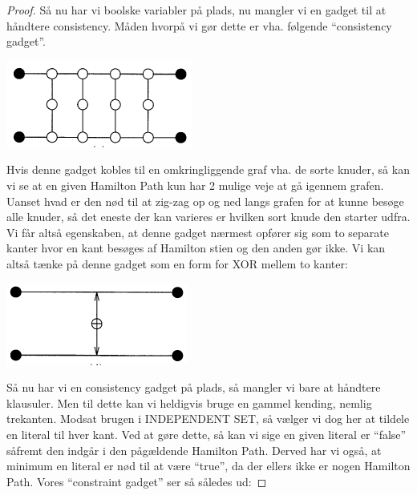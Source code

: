 \begin{proof}
Så nu har vi boolske variabler på plads, nu mangler vi en gadget til at
håndtere consistency. Måden hvorpå vi gør dette er vha. følgende ``consistency
gadget''.

\begin{center}
 \includegraphics[bb=0 0 173 81]{./consistencyGadget.png}
\end{center}

Hvis denne gadget kobles til en omkringliggende graf vha. de sorte knuder, så
kan vi se at en given Hamilton Path kun har 2 mulige veje at gå igennem grafen.
Uanset hvad er den nød til at zig-zag op og ned langs grafen for at kunne
besøge alle knuder, så det eneste der kan varieres er hvilken sort knude den
starter udfra. Vi får altså egenskaben, at denne gadget nærmest opfører sig som
to separate kanter hvor en kant besøges af Hamilton stien og den anden gør
ikke. Vi kan altså tænke på denne gadget som en form for XOR mellem to kanter:

\begin{center}
 \includegraphics[bb=0 0 173 81]{./consistencyGadget2.png}
\end{center}

Så nu har vi en consistency gadget på plads, så mangler vi bare at håndtere
klausuler. Men til dette kan vi heldigvis bruge en gammel kending, nemlig
trekanten. Modsat brugen i INDEPENDENT SET, så vælger vi dog her at tildele en
literal til hver kant. Ved at gøre dette, så kan vi sige en given literal er
``false'' såfremt den indgår i den pågældende Hamilton Path. Derved har vi
også, at minimum en literal er nød til at være ``true'', da der ellers ikke er
nogen Hamilton Path. Vores ``constraint gadget'' ser så således ud:


\end{proof}
